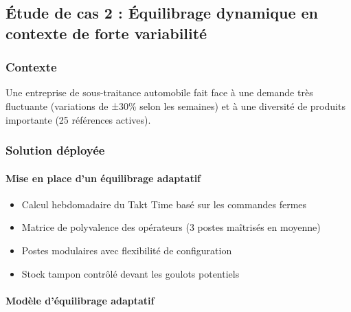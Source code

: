 \documentclass[12pt,a4paper]{article}
\begin{document}
\begin{center}
\subsection{Étude de cas 2 : Équilibrage dynamique en contexte de forte variabilité}

\subsubsection{Contexte}
Une entreprise de sous-traitance automobile fait face à une demande très fluctuante (variations de ±30\% selon les semaines) et à une diversité de produits importante (25 références actives).

\subsubsection{Solution déployée}

\paragraph{Mise en place d'un équilibrage adaptatif}
\begin{itemize}
    \item Calcul hebdomadaire du Takt Time basé sur les commandes fermes
    \item Matrice de polyvalence des opérateurs (3 postes maîtrisés en moyenne)
    \item Postes modulaires avec flexibilité de configuration
    \item Stock tampon contrôlé devant les goulots potentiels
\end{itemize}

\paragraph{Modèle d'équilibrage adaptatif}

\begin{figure}[H]
\centering
{}
\end{figure}
\end{center}
\end{document}
